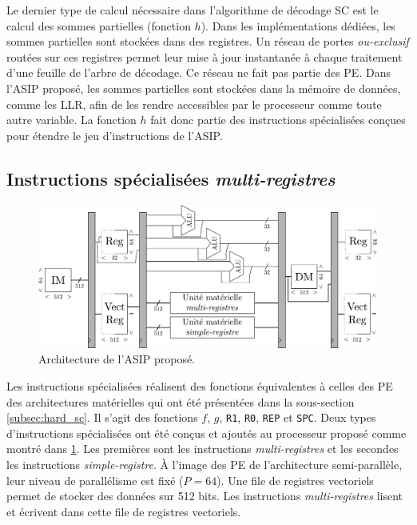Le dernier type de calcul nécessaire dans l'algorithme de décodage SC est le calcul des sommes partielles (fonction $h$). Dans les implémentations dédiées, les sommes partielles sont stockées dans des registres. Un réseau de portes \textit{ou-exclusif} routées sur ces registres permet leur mise à jour instantanée à chaque traitement d'une feuille de l'arbre de décodage. Ce réseau ne fait pas partie des PE. Dans l'ASIP proposé, les sommes partielles sont stockées dans la mémoire de données, comme les LLR, afin de les rendre accessibles par le processeur comme toute autre variable. La fonction $h$ fait donc partie des instructions spécialisées conçues pour étendre le jeu d'instructions de l'ASIP.

\subsection{Instructions spécialisées \textit{multi-registres}}
\label{subsec:multi_reg}

\begin{figure}
\centering
\includegraphics[width=\textwidth]{main/ch3_fig/full_tensilica}
\caption{Architecture de l'ASIP proposé.}
\label{fig:full_tensilica}
\end{figure}

Les instructions spécialisées réalisent des fonctions équivalentes à celles des PE des architectures matérielles qui ont été présentées dans la sous-section \ref{subsec:hard_sc}. Il s'agit des fonctions $f$, $g$, \texttt{R1}, \texttt{R0}, \texttt{REP} et \texttt{SPC}. Deux types d'instructions spécialisées ont été conçus et ajoutés au processeur proposé comme montré dans \ref{fig:full_tensilica}. Les premières sont les instructions \textit{multi-registres} et les secondes les instructions \textit{simple-registre}. \`A l'image des PE de l'architecture semi-parallèle, leur niveau de parallélisme est fixé ($P=64$). Une file de registres vectoriels permet de stocker des données sur 512 bits. Les instructions \textit{multi-registres} lisent et écrivent dans cette file de registres vectoriels.


